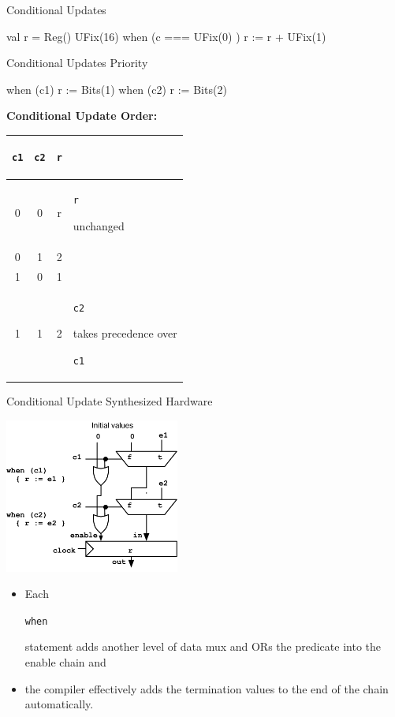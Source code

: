 \documentclass[xcolor=pdflatex,dvipsnames,table]{beamer}
\newcommand{\kode}[1]{\begin{footnotesize}{\tt #1}\end{footnotesize}}
\begin{document}
\begin{frame}[fragile]{Conditional Updates}

\begin{scala}
val r = Reg() { UFix(16) }
when (c === UFix(0) ) {
  r := r + UFix(1)
}
\end{scala}

\end{frame}

\begin{frame}[fragile]{Conditional Updates Priority}

\begin{scala}
when (c1) { r := Bits(1) }
when (c2) { r := Bits(2) }
\end{scala}

\textbf{Conditional Update Order:}

\begin{center}
\begin{tabular}{|c|c|c|l|}
\hline
\kode{c1} & \kode{c2}  &  \kode{r} & \\
\hline
0 &  0 & r &  \kode{r} unchanged \\
0 &  1 & 2 & \\
1 &  0 & 1 & \\
1 &  1 & 2& \kode{c2} takes precedence over \kode{c1} \\
\hline
\end{tabular}
\end{center}

\end{frame}

\begin{frame}[fragile]{Conditional Update Synthesized Hardware}

{\centering
\includegraphics[height=2in]{figs/condupdates.pdf}
}

\begin{itemize}
\item Each \kode{when} statement adds another level of data mux and ORs
  the predicate into the enable chain and
\item the compiler effectively adds
  the termination values to the end of the chain automatically.
\end{itemize}

\end{frame}
\end{document}
